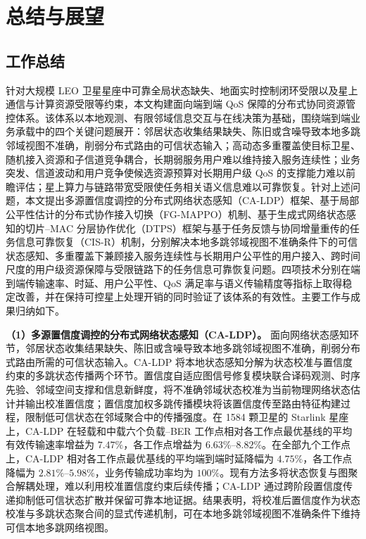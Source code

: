 
\chapter{总结与展望}
\label{chap:conclusion}

\section{工作总结}

针对大规模 LEO 卫星星座中可靠全局状态缺失、地面实时控制闭环受限以及星上通信与计算资源受限等约束，本文构建面向端到端 QoS 保障的分布式协同资源管控体系。该体系以本地观测、有限邻域信息交互与在线决策为基础，围绕端到端业务承载中的四个关键问题展开：邻居状态收集结果缺失、陈旧或含噪导致本地多跳邻域视图不准确，削弱分布式路由的可信状态输入；高动态多重覆盖使目标卫星、随机接入资源和子信道竞争耦合，长期弱服务用户难以维持接入服务连续性；业务突发、信道波动和用户竞争使候选资源预算对长期用户级 QoS 的支撑能力难以前瞻评估；星上算力与链路带宽受限使任务相关语义信息难以可靠恢复。针对上述问题，本文提出多源置信度调控的分布式网络状态感知（CA-LDP）框架、基于局部公平性估计的分布式协作接入切换（FG-MAPPO）机制、基于生成式网络状态感知的切片--MAC 分层协作优化（DTPS）框架与基于任务反馈与协同增量重传的任务信息可靠恢复（CIS-R）机制，分别解决本地多跳邻域视图不准确条件下的可信状态感知、多重覆盖下兼顾接入服务连续性与长期用户公平性的用户接入、跨时间尺度的用户级资源保障与受限链路下的任务信息可靠恢复问题。四项技术分别在端到端传输速率、时延、用户公平性、QoS 满足率与语义传输精度等指标上取得稳定改善，并在保持可控星上处理开销的同时验证了该体系的有效性。主要工作与成果归纳如下。

\textbf{（1）多源置信度调控的分布式网络状态感知（CA-LDP）。} 面向网络状态感知环节，邻居状态收集结果缺失、陈旧或含噪导致本地多跳邻域视图不准确，削弱分布式路由所需的可信状态输入。CA-LDP 将本地状态感知分解为状态校准与置信度约束的多跳状态传播两个环节。置信度自适应图信号修复模块联合译码观测、时序先验、邻域空间支撑和信息新鲜度，将不准确邻域状态校准为当前物理网络状态估计并输出校准置信度；置信度加权多跳传播模块将该置信度传至路由特征构建过程，限制低可信状态在邻域聚合中的传播强度。在 1584 颗卫星的 Starlink 星座上，CA-LDP 在轻载和中载六个负载--BER 工作点相对各工作点最优基线的平均有效传输速率增益为 $7.47\%$，各工作点增益为 $6.63\%$--$8.82\%$。在全部九个工作点上，CA-LDP 相对各工作点最优基线的平均端到端时延降幅为 $4.75\%$，各工作点降幅为 $2.81\%$--$5.98\%$，业务传输成功率均为 $100\%$。现有方法多将状态恢复与图聚合解耦处理，难以利用校准置信度约束后续传播；CA-LDP 通过跨阶段置信度传递抑制低可信状态扩散并保留可靠本地证据。结果表明，将校准后置信度作为状态校准与多跳状态聚合间的显式传递机制，可在本地多跳邻域视图不准确条件下维持可信本地多跳网络视图。

